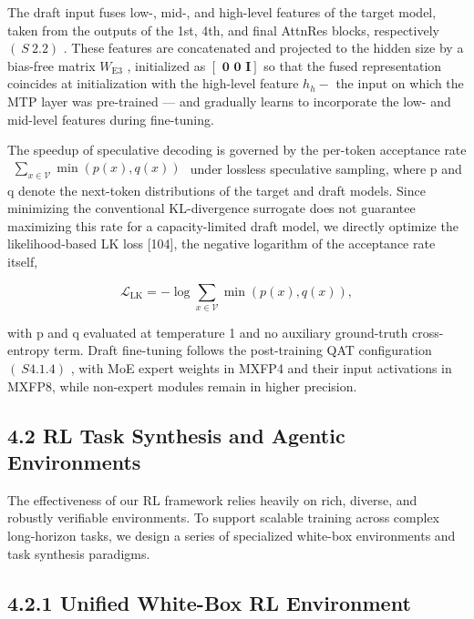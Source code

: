 \documentclass[
  10
]{article}
\begin{document}
The draft input fuses low-, mid-, and high-level features of the target
model, taken from the outputs of the 1st, 4th, and final AttnRes blocks,
respectively \(( \ S ~ 2 . 2 )\) . These features are concatenated and
projected to the hidden size by a bias-free matrix
\(W _ { \mathrm { E 3 } }\) , initialized as
\(\left[ \textbf { 0 0 } \pmb { I } \right]\) so that the fused
representation coincides at initialization with the high-level feature
\(h _ { h } -\) the input on which the MTP layer was pre-trained --- and
gradually learns to incorporate the low- and mid-level features during
fine-tuning.

The speedup of speculative decoding is governed by the per-token
acceptance rate
\(\begin{array} { r } { \sum _ { x \in \mathcal { V } } \operatorname* { m i n } ( p ( x ) , q ( x ) ) } \end{array}\)
under lossless speculative sampling, where p and q denote the next-token
distributions of the target and draft models. Since minimizing the
conventional KL-divergence surrogate does not guarantee maximizing this
rate for a capacity-limited draft model, we directly optimize the
likelihood-based LK loss {[}104{]}, the negative logarithm of the
acceptance rate itself,

\[
\mathcal {L} _ {\mathrm{LK}} = - \log \sum_ {x \in \mathcal {V}} \min (p (x), q (x)),\tag{16}
\]

with p and q evaluated at temperature 1 and no auxiliary ground-truth
cross-entropy term. Draft fine-tuning follows the post-training QAT
configuration \(( \ S 4 . 1 . 4 )\) , with MoE expert weights in MXFP4
and their input activations in MXFP8, while non-expert modules remain in
higher precision.

\subsection{4.2 RL Task Synthesis and Agentic
Environments}\label{rl-task-synthesis-and-agentic-environments}

The effectiveness of our RL framework relies heavily on rich, diverse,
and robustly verifiable environments. To support scalable training
across complex long-horizon tasks, we design a series of specialized
white-box environments and task synthesis paradigms.

\subsection{4.2.1 Unified White-Box RL
Environment}\label{unified-white-box-rl-environment}
\end{document}
